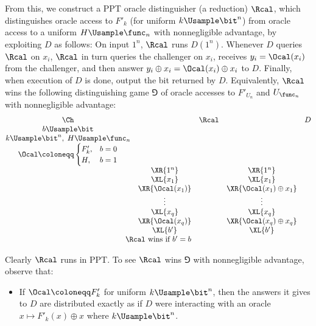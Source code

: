 \begin{answer}[b]
    From this, we construct a PPT oracle distinguisher (a reduction) $\Rcal$, which distinguishes oracle access to $F'_k$ (for uniform $k\Usample \bit^n$) from oracle access to a uniform $H\Usample\func_n$ with nonnegligible advantage, by exploiting $D$ as follows: On input $1^n$, $\Rcal$ runs $D(1^n)$. Whenever $D$ queries $\Rcal$ on $x_i$, $\Rcal$ in turn queries the challenger on $x_i$, receives $y_i=\Ocal(x_i)$ from the challenger, and then answer $y_i\oplus x_i=\Ocal(x_i)\oplus x_i$ to $D$. Finally, when execution of $D$ is done, output the bit returned by $D$. Equivalently, $\Rcal$ wins the following distinguishing game $\Game$ of oracle accesses to $F'_{U_n}$ and $U_{\func_n}$ with nonnegligible advantage:
    {
        \[
            \begin{array}{@{} c c c c c@{}}
            \Ch & & \Rcal & & D \\
            b\Usample\bit & & & & \\
            k\Usample\bit^n,\; H\Usample \func_n & & & & \\
            \Ocal \coloneqq \begin{cases}
                F'_{k}, &b=0\\
                H, &b=1
            \end{cases} & & & & \\
            & \XR{1^n} & & \XR{1^n} & \\
            & \XL{x_1} & & \XL{x_1} & \\
            & \XR{\Ocal(x_1)} & & \XR{\Ocal(x_1)\oplus x_1} & \\
            & \vdots & & \vdots & \\
            & \XL{x_q} & & \XL{x_q} & \\
            & \XR{\Ocal(x_q)} & & \XR{\Ocal(x_q)\oplus x_q} & \\
            & \XL{b'} & & \XL{b'} & \\
            \multicolumn{5}{c}{\text{$\Rcal$ wins if $b' = b$}}
            \end{array}
        \]
        \label{fig:p2-game1}
    }

    Clearly $\Rcal$ runs in PPT. To see $\Rcal$ wins $\Game$ with nonnegligible advantage, observe that:
    \begin{itemize}
        \item If $\Ocal \coloneqq F'_k$ for uniform $k\Usample\bit^n$, then the answers it gives to $D$ are distributed exactly as if $D$ were interacting with an oracle $x\mapsto F'_k(x)\oplus x$  where $k\Usample \bit^n$.
        

\end{itemize}
\end{answer}
